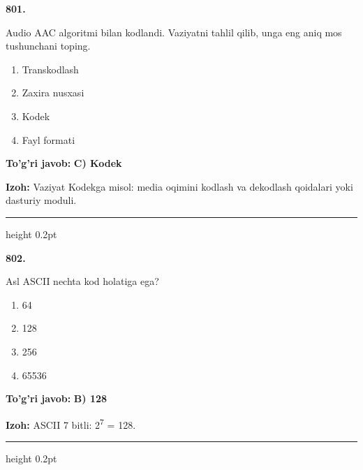\documentclass[10pt,a4paper,oneside]{article}
\begin{document}
\noindent\textbf{\color{ink}801.}
\par
Audio AAC algoritmi bilan kodlandi. Vaziyatni tahlil qilib, unga eng aniq mos tushunchani toping.
\begin{enumerate}[label=\Alph*),leftmargin=9mm]
\item Transkodlash
\item Zaxira nusxasi
\item Kodek
\item Fayl formati
\end{enumerate}
\begin{tcolorbox}[enhanced,breakable,colback=teal!4,colframe=teal!50!black,boxrule=0.5pt,arc=1.1mm,left=3mm,right=3mm,top=1.7mm,bottom=1.7mm,before skip=2mm,after skip=2mm]
\textbf{\color{teal}To'g'ri javob:} \textbf{C) Kodek}
\par\smallskip
\textbf{Izoh:} Vaziyat Kodekga misol: media oqimini kodlash va dekodlash qoidalari yoki dasturiy moduli.
\end{tcolorbox}
\vspace{2mm}\hrule height 0.2pt \vspace{3mm}

\noindent\textbf{\color{ink}802.}
\par
Asl ASCII nechta kod holatiga ega?
\begin{enumerate}[label=\Alph*),leftmargin=9mm]
\item 64
\item 128
\item 256
\item 65536
\end{enumerate}
\begin{tcolorbox}[enhanced,breakable,colback=teal!4,colframe=teal!50!black,boxrule=0.5pt,arc=1.1mm,left=3mm,right=3mm,top=1.7mm,bottom=1.7mm,before skip=2mm,after skip=2mm]
\textbf{\color{teal}To'g'ri javob:} \textbf{B) 128}
\par\smallskip
\textbf{Izoh:} ASCII 7 bitli: 2\textsuperscript{7} = 128.
\end{tcolorbox}
\vspace{2mm}\hrule height 0.2pt \vspace{3mm}
\end{document}
